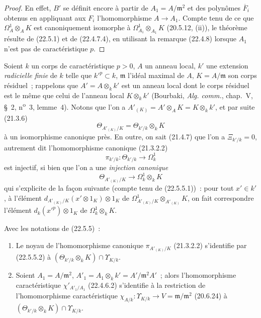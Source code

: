 \begin{proof}
En effet, $B'$ se définit encore à partir de $A_1=A/\mathfrak m^2$ et des
polynômes $\overline F_i$ obtenus en appliquant aux $F_i$ l'homomorphisme
$A\longrightarrow A_1$. Compte tenu de ce que $\Omega^1_A\otimes_AK$ est
canoniquement isomorphe à $\Omega^1_{A_1}\otimes_{A_1}K$ (20.5.12, (ii)), le
théorème résulte de (22.5.1) et de (22.4.7.4), en utilisant la remarque
(22.4.8) lorsque $A_1$ n'est pas de caractéristique $p$.
\end{proof}


\begin{env}[22.5.5]
\label{0.22.5.5-fr}
Soient $k$ un corps de caractéristique $p>0$, $A$ un anneau local, $k'$ une
extension \emph{radicielle finie} de $k$ telle que $k'^p\subset k$,
$\mathfrak m$ l'idéal maximal de $A$, $K=A/\mathfrak m$ son corps résiduel~;
rappelons que $A'=A\otimes_kk'$ est un anneau local dont le corps résiduel est
le même que celui de l'anneau local $K\otimes_kk'$ (Bourbaki,
\emph{Alg. comm.}, chap.~V, §~2, n\textsuperscript{o}~3, lemme~4). Notons que
l'on a $A'_{(K)}=A'\otimes_AK=K\otimes_kk'$, et par suite (21.3.6)
\begin{equation}
\label{0.22.5.5.1-fr}
  \Theta_{A'_{(K)}/K}=\Theta_{k'/k}\otimes_kK
  \tag{22.5.5.1}
\end{equation}
à un isomorphisme canonique près. En outre, on sait (21.4.7) que l'on a
$\Xi_{k'/k}=0$, autrement dit l'homomorphisme canonique (21.3.2.2)
\[
  \pi_{k'/k}:\Theta_{k'/k}\longrightarrow\Omega^1_k
\]
est injectif, si bien que l'on a une \emph{injection canonique}
\begin{equation}
\label{0.22.5.5.2-fr}
  \Theta_{A'_{(K)}/K}\longrightarrow\Omega^1_k\otimes_kK
  \tag{22.5.5.2}
\end{equation}
qui s'explicite de la façon suivante (compte tenu de (22.5.5.1))~: pour tout
$x'\in k'$, à l'élément
$d_{A'_{(K)}/K}(x'\otimes1_K)\otimes1_K$ de
$\Omega^1_{A'_{(K)}/K}\otimes_{A'_{(K)}}K$, on fait correspondre l'élément
$d_k(x'^p)\otimes1_K$ de $\Omega^1_k\otimes_kK$.
\end{env}

\begin{lemma}[22.5.6]
\label{0.22.5.6-fr}
Avec les notations de (22.5.5)~:
\begin{enumerate}
  \item[\rm(i)] Le noyau de l'homomorphisme canonique
  $\pi_{A'_{(K)}/K}$ (21.3.2.2) s'identifie par (22.5.5.2) à
  $(\Theta_{k'/k}\otimes_kK)\cap\Upsilon_{K/k}$.
  \item[\rm(ii)] Soient $A_1=A/\mathfrak m^2$,
  $A'_1=A_1\otimes_kk'=A'/\mathfrak m^2A'$~; alors l'homomorphisme
  caractéristique $\chi'_{A'_1/A_1}$ (22.4.6.2) s'identifie à la restriction de
  l'homomorphisme caractéristique
  $\chi_{A/k}:\Upsilon_{K/k}\longrightarrow V=\mathfrak m/\mathfrak m^2$
  (20.6.24) à $(\Theta_{k'/k}\otimes_kK)\cap\Upsilon_{K/k}$.
\end{enumerate}
\end{lemma}

